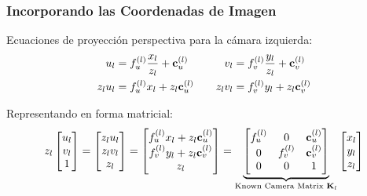\begin{frame}
    \frametitle{Incorporando las Coordenadas de Imagen}
    Ecuaciones de proyección perspectiva para la cámara izquierda:
    \begin{align*}
        u_l &= f_u^{(l)} \frac{x_l}{z_l} + \boldsymbol{\mathbf{c}}_{u}^{(l)} \quad & v_l &= f_v^{(l)} \frac{y_l}{z_l} + \boldsymbol{\mathbf{c}}_{v}^{(l)} \\
        z_l u_l &= f_u^{(l)} x_l + z_l \boldsymbol{\mathbf{c}}_{u}^{(l)} \quad & z_l v_l &= f_v^{(l)} y_l + z_l \boldsymbol{\mathbf{c}}_{v}^{(l)}
    \end{align*}

    Representando en forma matricial:
    \begin{equation*}
        z_l \begin{bmatrix} u_l \\ v_l \\ 1 \end{bmatrix} =
        \begin{bmatrix}
            z_l u_l \\
            z_l v_l \\
            z_l
        \end{bmatrix} =
        \begin{bmatrix}
            f_u^{(l)} x_l + z_l \boldsymbol{\mathbf{c}}_{u}^{(l)} \\
            f_v^{(l)} y_l + z_l \boldsymbol{\mathbf{c}}_{v}^{(l)} \\
            z_l
        \end{bmatrix} =
        \underbrace{\begin{bmatrix}
            f_u^{(l)} & 0 & \boldsymbol{\mathbf{c}}_{u}^{(l)} \\
            0 & f_v^{(l)} & \boldsymbol{\mathbf{c}}_{v}^{(l)} \\
            0 & 0 & 1
        \end{bmatrix}}_{\text{Known Camera Matrix } \boldsymbol{\mathbf{K}}_l}
        \begin{bmatrix} x_l \\ y_l \\ z_l \end{bmatrix}
    \end{equation*}
\end{frame}

